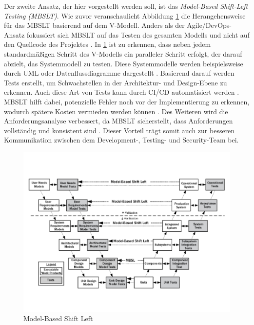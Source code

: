 Der zweite Ansatz, der hier vorgestellt werden soll, ist das \textit{Model-Based Shift-Left Testing (MBSLT)}. Wie zuvor veranschaulicht Abbildung \ref{fig:modelbased} die Herangehensweise für das MBSLT basierend auf dem V-Modell. Anders als der Agile/DevOps-Ansatz fokussiert sich MBSLT auf das Testen des gesamten Modells und nicht auf den Quellcode des Projektes \cite{rani_shift-left_2023}. In \ref{fig:modelbased} ist zu erkennen, dass neben jedem standardmäßigen Schritt des V-Modells ein paralleler Schritt erfolgt, der darauf abzielt, das Systemmodell zu testen. Diese Systemmodelle werden beispielsweise durch UML oder Datenflussdiagramme dargestellt \cite{rani_shift-left_2023}. Basierend darauf werden Tests erstellt, um Schwachstellen in der Architektur- und Design-Ebene zu erkennen. Auch diese Art von Tests kann durch CI/CD automatisiert werden \cite{rani_shift-left_2023}. MBSLT hilft dabei, potenzielle Fehler noch vor der Implementierung zu erkennen, wodurch spätere Kosten vermieden werden können \cite{rani_shift-left_2023}. Des Weiteren wird die Anforderungsanalyse verbessert, da MBSLT sicherstellt, dass Anforderungen vollständig und konsistent sind \cite{rani_shift-left_2023}. Dieser Vorteil trägt somit auch zur besseren Kommunikation zwischen dem Development-, Testing- und Security-Team bei.

\begin{figure}
    \centering
    \includegraphics[width=0.9\linewidth]{images/Model_Based_Shift_Left.png}
    \caption{Model-Based Shift Left \cite{firesmith_four_2015}}
    \label{fig:modelbased}
\end{figure}

